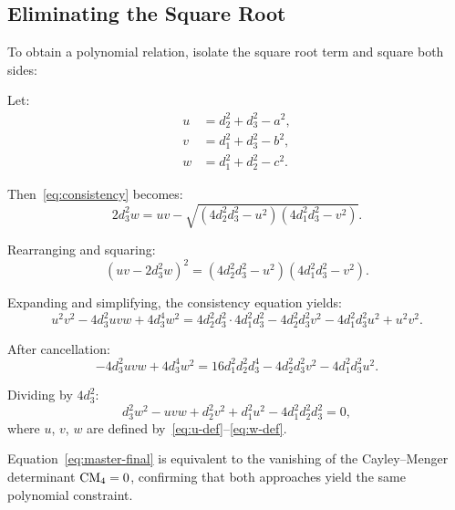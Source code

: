 \subsection{Eliminating the Square Root}

To obtain a polynomial relation, isolate the square root term and square both sides:

Let:
\begin{align}
u &= d_2^2 + d_3^2 - a^2, \label{eq:u-def} \\
v &= d_1^2 + d_3^2 - b^2, \label{eq:v-def} \\
w &= d_1^2 + d_2^2 - c^2. \label{eq:w-def}
\end{align}

Then~\eqref{eq:consistency} becomes:
\begin{equation}
2d_3^2 w = uv - \sqrt{(4d_2^2 d_3^2 - u^2)(4d_1^2 d_3^2 - v^2)}.
\end{equation}

Rearranging and squaring:
\begin{equation}
(uv - 2d_3^2 w)^2 = (4d_2^2 d_3^2 - u^2)(4d_1^2 d_3^2 - v^2).
\end{equation}

\begin{theorem}
\label{thm:master-polynomial}
Expanding and simplifying, the consistency equation yields:
\begin{equation}
\label{eq:master-poly}
u^2 v^2 - 4d_3^2 uvw + 4d_3^4 w^2 = 4d_2^2 d_3^2 \cdot 4d_1^2 d_3^2 - 4d_2^2 d_3^2 v^2 - 4d_1^2 d_3^2 u^2 + u^2 v^2.
\end{equation}

After cancellation:
\begin{equation}
\label{eq:master-simplified}
- 4d_3^2 uvw + 4d_3^4 w^2 = 16d_1^2 d_2^2 d_3^4 - 4d_2^2 d_3^2 v^2 - 4d_1^2 d_3^2 u^2.
\end{equation}

Dividing by $4d_3^2$:
\begin{equation}
\label{eq:master-final}
\boxed{d_3^2 w^2 - uvw + d_2^2 v^2 + d_1^2 u^2 - 4d_1^2 d_2^2 d_3^2 = 0,}
\end{equation}
where $u$, $v$, $w$ are defined by~\eqref{eq:u-def}--\eqref{eq:w-def}.
\end{theorem}

\begin{remark}
Equation~\eqref{eq:master-final} is equivalent to the vanishing of the Cayley--Menger determinant $\mathrm{CM}_4 = 0$, confirming that both approaches yield the same polynomial constraint.
\end{remark}

